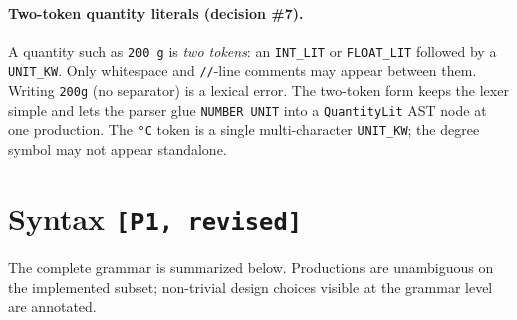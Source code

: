 \documentclass[11pt,a4paper]{article}
\begin{document}
\paragraph{Two-token quantity literals (decision \#7).} A quantity such
as \texttt{200 g} is \emph{two tokens}: an \texttt{INT\_LIT} or
\texttt{FLOAT\_LIT} followed by a \texttt{UNIT\_KW}. Only whitespace and
\texttt{//}-line comments may appear between them. Writing
\texttt{200g} (no separator) is a lexical error. The two-token form
keeps the lexer simple and lets the parser glue \texttt{NUMBER UNIT}
into a \texttt{QuantityLit} AST node at one production. The \texttt{°C}
token is a single multi-character \texttt{UNIT\_KW}; the degree symbol
may not appear standalone.


\section{Syntax \texttt{[P1, revised]}}

The complete grammar is summarized below. Productions are unambiguous on
the implemented subset; non-trivial design choices visible at the grammar
level are annotated.
\end{document}
